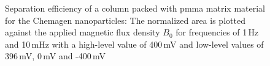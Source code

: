 \begin{figure}
\centering
{}
\caption[Separation efficiency of a column packed with PMMA matrix material]{Separation efficiency of a column packed with \gls{pmma} matrix material for the Chemagen nanoparticles: The normalized area is plotted against the applied magnetic flux density $B_{0}$ for frequencies of 1\,Hz and 10\,mHz with a high-level value of 400\,mV and low-level values of 396\,mV, 0\,mV and -400\,mV
\label{fig:norm_area_PMMA}
}
\end{figure}

